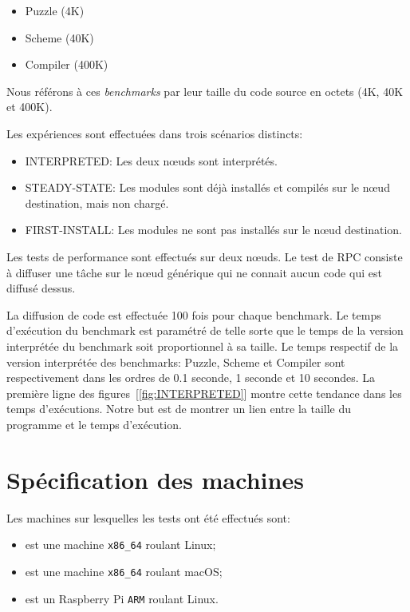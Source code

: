 \begin{itemize}
  \item Puzzle (4K)
  \item Scheme (40K)
  \item Compiler (400K)
\end{itemize}

Nous référons à ces \textit{benchmarks} par leur taille du code source
en octets (4K, 40K et 400K).

Les expériences sont effectuées dans trois scénarios distincts:
\begin{itemize}
  \item INTERPRETED: Les deux nœuds sont interprétés.
  \item STEADY-STATE: Les modules sont déjà installés et compilés sur
    le nœud destination, mais non chargé.
  \item FIRST-INSTALL: Les modules ne sont pas installés sur le nœud
    destination.
\end{itemize}

Les tests de performance sont effectués sur deux nœuds.  Le test de RPC
consiste à diffuser une tâche sur le nœud générique qui ne connait
aucun code qui est diffusé dessus.

La diffusion de code est effectuée 100 fois pour chaque benchmark. Le temps
d'exécution du benchmark est paramétré de telle sorte que le temps de la
version interprétée du benchmark soit proportionnel à sa taille. Le temps
respectif de la version interprétée des benchmarks: Puzzle, Scheme et Compiler
sont respectivement dans les ordres de 0.1 seconde, 1 seconde et 10 secondes.
La première ligne des figures~[\ref{fig:INTERPRETED}] montre cette tendance
dans les temps d'exécutions. Notre but est de montrer un lien entre la taille
du programme et le temps d'exécution.

\section{Spécification des machines}
Les machines sur lesquelles les tests ont été effectués sont:
\begin{itemize}
  \item \MMM[x86/Linux] est une machine \texttt{x86\_64} roulant Linux;
  \item \MMM[x86/macOS] est une machine \texttt{x86\_64} roulant macOS;
  \item {} est un Raspberry Pi \texttt{ARM} roulant Linux.
\end{itemize}

